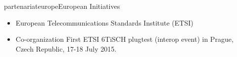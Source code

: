 \documentclass{ra2016}
\begin{document}
\begin{module}{partenariat}{europe}{European Initiatives}
\begin{itemize}
    \item European Telecommunications Standards Institute (ETSI)
    \item Co-organization First ETSI 6TiSCH plugtest (interop event) in Prague, Czech Republic, 17-18 July 2015.
\end{itemize}


\end{module}

 
\end{document}
